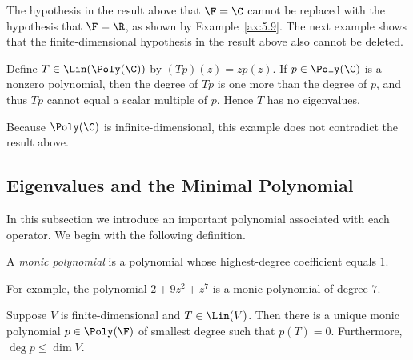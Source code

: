 The hypothesis in the result above that $\F=\C$ cannot be replaced with the
hypothesis that $\F=\R$, as shown by Example~\ref{ax:5.9}. The next example
shows that the finite-dimensional hypothesis in the result above also cannot
be deleted.

\begin{example}\label{ax:5.20}
Define $T\in\Lin(\Poly(\C))$ by $(Tp)(z)=zp(z)$. If $p\in\Poly(\C)$ is a
nonzero polynomial, then the degree of $Tp$ is one more than the degree of
$p$, and thus $Tp$ cannot equal a scalar multiple of $p$. Hence $T$ has no
eigenvalues.

Because $\Poly(\C)$ is infinite-dimensional, this example does not contradict
the result above.
\end{example}

\subsection{Eigenvalues and the Minimal Polynomial}

In this subsection we introduce an important polynomial associated with each
operator. We begin with the following definition.

\begin{definition}\label{ax:5.21}
A \emph{monic polynomial} is a polynomial whose highest-degree coefficient
equals $1$.
\end{definition}

For example, the polynomial $2+9z^2+z^7$ is a monic polynomial of degree $7$.

\begin{result}\label{ax:5.22}
Suppose $V$ is finite-dimensional and $T\in\Lin(V)$. Then there is a unique
monic polynomial $p\in\Poly(\F)$ of smallest degree such that $p(T)=0$.
Furthermore, $\deg p\le\dim V$.
\end{result}


